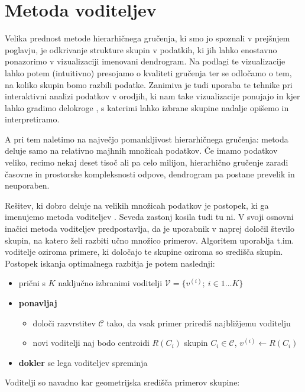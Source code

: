 \chapter{Metoda voditeljev}

Velika prednost metode hierarhičnega gručenja, ki smo jo spoznali v prejšnjem poglavju, je odkrivanje strukture skupin v podatkih, ki jih lahko enostavno ponazorimo v vizualizaciji imenovani dendrogram. Na podlagi te vizualizacije lahko potem (intuitivno) presojamo o kvaliteti gručenja ter se odločamo o tem, na koliko skupin bomo razbili podatke. Zanimiva je tudi uporaba te tehnike pri interaktivni analizi podatkov v orodjih, ki nam take vizualizacije ponujajo in kjer lahko gradimo delokroge , s katerimi lahko izbrane skupine nadalje opišemo in interpretiramo.

A pri tem naletimo na največjo pomankljivost hierarhičnega gručenja: metoda deluje samo na relativno majhnih množicah podatkov. Če imamo podatkov veliko, recimo nekaj deset tisoč ali pa celo milijon, hierarhično gručenje zaradi časovne in prostorske kompleksnosti odpove, dendrogram pa postane prevelik in neuporaben.

Rešitev, ki dobro deluje na velikih množicah podatkov je postopek, ki ga imenujemo metoda voditeljev . Seveda zastonj kosila tudi tu ni. V svoji
osnovni inačici metoda voditeljev predpostavlja, da je uporabnik v naprej določil število skupin,
na katero želi razbiti učno množico primerov. Algoritem uporablja
t.im. voditelje oziroma primere, ki določajo te skupine oziroma so
središča skupin. Postopek iskanja optimalnega razbitja je potem
naslednji:

\begin{itemize}
\item prični s $K$ naključno izbranimi voditelji $\mathcal{V}=\{v^{(i)};\ i\in{1\ldots K}\}$
\item {\bf ponavljaj}
\begin{itemize}
  \item določi razvrstitev $\mathcal{C}$ tako, da vsak primer prirediš
    najbližjemu voditelju
  \item novi voditelji naj bodo centroidi $R(C_i)$ skupin $C_i\in\mathcal{C}$, $v^{(i)}\leftarrow R(C_i)$
\end{itemize}
\item {\bf dokler} se lega voditeljev spreminja
\end{itemize}

Voditelji  so navadno kar geometrijska središča primerov skupine:

